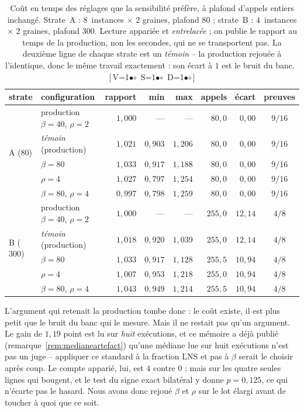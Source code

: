 \documentclass[11pt,a4paper]{article}
\theoremstyle{plain}
\theoremstyle{remark}
\newcommand{\cfgm}[1]{\ifnum#1=1$\bullet$\else$\circ$\fi}
\newcommand{\conf}[3]{%
  \textsf{\footnotesize[\,V\cfgm{#1}\ S\cfgm{#2}\ D\cfgm{#3}\,]}}
\begin{document}
\begin{table}[H]
\centering
\caption{Coût en temps des réglages que la sensibilité préfère, à plafond
d'appels entiers inchangé. Strate~A : $8$~instances $\times$ $2$ graines,
plafond $80$ ; strate~B : $4$~instances $\times$ $2$ graines, plafond $300$.
Lecture appariée et \emph{entrelacée} ; on publie le rapport au temps de la
production, non les secondes, qui ne se transportent pas. La deuxième ligne
de chaque strate est un \emph{témoin} -- la production rejouée à
l'identique, donc le même travail exactement : son écart à $1$ est le bruit
du banc.\ \conf{1}{1}{1}}
\label{tab:temps}
\setlength{\tabcolsep}{5pt}\small
\begin{tabular}{llrrrrrc}
\toprule
strate & configuration & rapport & min & max & appels & écart & preuves\\
\midrule
\multirow{5}{*}{A ($80$)}
 & production $\beta=40$, $\rho=2$ & $1{,}000$ & --- & --- & $80{,}0$ & $0{,}00$ & $9/16$\\
 & \emph{témoin} (production) & $1{,}021$ & $0{,}903$ & $1{,}206$ & $80{,}0$ & $0{,}00$ & $9/16$\\
 & $\beta=80$ & $1{,}033$ & $0{,}917$ & $1{,}188$ & $80{,}0$ & $0{,}00$ & $9/16$\\
 & $\rho=4$ & $1{,}027$ & $0{,}797$ & $1{,}254$ & $80{,}0$ & $0{,}00$ & $9/16$\\
 & $\beta=80$, $\rho=4$ & $0{,}997$ & $0{,}798$ & $1{,}259$ & $80{,}0$ & $0{,}00$ & $9/16$\\
\midrule
\multirow{5}{*}{B ($300$)}
 & production $\beta=40$, $\rho=2$ & $1{,}000$ & --- & --- & $255{,}0$ & $12{,}14$ & $4/8$\\
 & \emph{témoin} (production) & $1{,}018$ & $0{,}920$ & $1{,}039$ & $255{,}0$ & $12{,}14$ & $4/8$\\
 & $\beta=80$ & $1{,}033$ & $0{,}917$ & $1{,}128$ & $255{,}5$ & $10{,}94$ & $4/8$\\
 & $\rho=4$ & $1{,}007$ & $0{,}953$ & $1{,}218$ & $255{,}0$ & $10{,}94$ & $4/8$\\
 & $\beta=80$, $\rho=4$ & $1{,}043$ & $0{,}949$ & $1{,}214$ & $255{,}5$ & $10{,}94$ & $4/8$\\
\bottomrule
\end{tabular}
\end{table}

\noindent
L'argument qui retenait la production tombe donc : le coût existe, il est
plus petit que le bruit du banc qui le mesure. Mais il ne restait pas qu'un
argument. Le gain de $1{,}19$ point est lu sur \emph{huit} exécutions, et ce
mémoire a déjà publié (remarque~\ref{rem:medianeartefact}) qu'une médiane
lue sur huit exécutions n'est pas un juge -- appliquer ce standard à la
fraction LNS et pas à $\beta$ serait le choisir après coup. Le compte
apparié, lui, est $4$ contre $0$ ; mais sur les quatre seules lignes qui
bougent, et le test du signe exact bilatéral y donne $p=0{,}125$, ce qui
n'écarte pas le hasard. Nous avons donc rejoué $\beta$ et $\rho$ sur le lot
élargi avant de toucher à quoi que ce soit.
\end{document}
